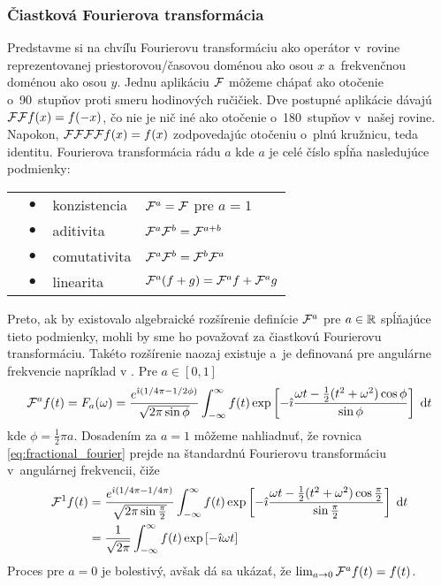 \subsubsection{Čiastková Fourierova transformácia}
Predstavme si na chvíľu Fourierovu transformáciu ako operátor
v~rovine reprezentovanej priestorovou/časovou doménou ako osou $x$ 
a~frekvenčnou doménou ako osou $y$.
Jednu aplikáciu $\mathcal{F}$ môžeme chápať ako otočenie o~90~stupňov
proti smeru hodinových ručičiek.
Dve postupné aplikácie dávajú $\mathcal{F}\mathcal{F} f(x) = f(-x)$, čo nie je nič
iné ako otočenie o~180~stupňov v~našej rovine. Napokon,
$\mathcal{F}\mathcal{F}\mathcal{F}\mathcal{F} f(x) = f(x)$ zodpovedajúc otočeniu 
o~plnú kružnicu, teda identitu.
Fourierova transformácia rádu $a$ kde $a$ je celé číslo spĺňa
nasledujúce podmienky:\\
\begin{tabular}{l l l}
    $~~~~\bullet$&konzistencia& $\mathcal{F}^a = \mathcal{F}$ pre $a=1$ \\
    $~~~~\bullet$&aditivita& $\mathcal{F}^a \mathcal{F}^b = \mathcal{F}^{a+b}$ \\
    $~~~~\bullet$&comutativita & $\mathcal{F}^a \mathcal{F}^b = \mathcal{F}^b \mathcal{F}^a$ \\
    $~~~~\bullet$&linearita& $\mathcal{F}^a(f+g) = \mathcal{F}^a f + \mathcal{F}^a g$
\end{tabular}


Preto, ak by existovalo algebraické rozšírenie definície $\mathcal{F}^a$
pre $a\in {\mathbb R}$ spĺňajúce tieto
podmienky, mohli by sme ho považovať za čiastkovú Fourierovu
transformáciu. Takéto rozšírenie naozaj existuje a~je definovaná pre angulárne
frekvencie napríklad v \cite{saxsin}.
Pre $a\in[0,1]$ 
\begin{equation}
    \mathcal{F}^a f(t) = F_a(\omega) =
        \frac{e^{\hat{\imath}( 1/4 \pi - 1/2 \phi)}}{\sqrt{2\pi \sin \phi}}
        \int_{-\infty}^{\infty} f(t) \exp\left[ 
            -\hat{\imath} \frac{\omega t - \frac{1}{2}( t^2 + \omega^2)
            \cos\phi }{\sin \phi}
        \right] \; \mathrm{d} t
    \label{eq:fractional_fourier}
\end{equation}
kde $\phi = \frac{1}{2} \pi a$.
Dosadením za $a=1$ môžeme nahliadnuť, že rovnica
\eqref{eq:fractional_fourier} prejde na štandardnú Fourierovu
transformáciu v~angulárnej frekvencii, čiže
\begin{equation*}
    \begin{split}
    \mathcal{F}^1 f(t) &=
        \frac{e^{\hat{\imath}( 1/4 \pi - 1/4 \pi)}}{\sqrt{2 \pi \sin \frac{\pi}{2}} }
        \int_{-\infty}^{\infty} f(t) \exp\left[ 
            -\hat{\imath} \frac{\omega t - \frac{1}{2}( t^2 + \omega^2)
            \cos\frac{\pi}{2} }{\sin \frac{\pi}{2}}
        \right] \; \mathrm{d} t \\
        &= \frac{1}{\sqrt{2 \pi}} 
            \int_{-\infty}^{\infty} f(t) \exp\left[ -\hat{\imath} \omega t\right]
        \end{split}
\end{equation*}
Proces pre $a=0$ je bolestivý, avšak dá sa ukázať, že
$\lim_{a\rightarrow0} \mathcal{F}^a f(t) = f(t)$.

